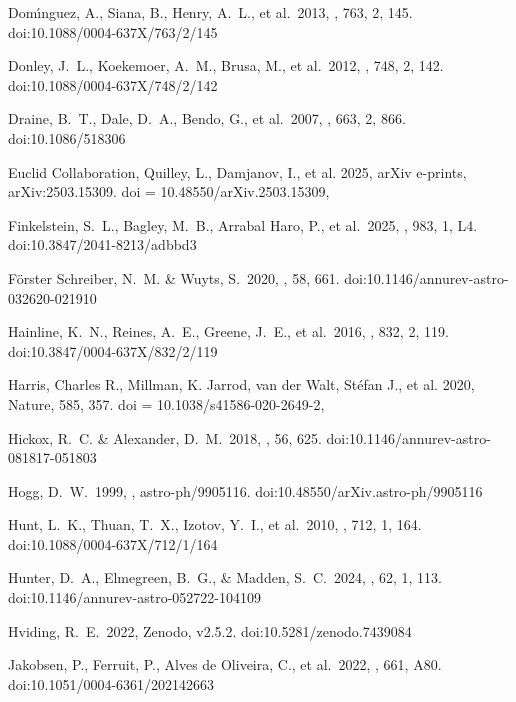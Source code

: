 \documentclass[twocolumn]{aastex63}
\begin{document}
{\begin{thebibliography}{}
 Dom{\'\i}nguez, A., Siana, B., Henry, A.~L., et al.\ 2013, \apj, 763, 2, 145. doi:10.1088/0004-637X/763/2/145

 Donley, J.~L., Koekemoer, A.~M., Brusa, M., et al.\ 2012, \apj, 748, 2, 142. doi:10.1088/0004-637X/748/2/142

 Draine, B.~T., Dale, D.~A., Bendo, G., et al.\ 2007, \apj, 663, 2, 866. doi:10.1086/518306

 {Euclid Collaboration}, {Quilley}, L., {Damjanov}, I., et al.  2025,  {arXiv e-prints}, {arXiv:2503.15309}.       doi = {10.48550/arXiv.2503.15309},

 Finkelstein, S.~L., Bagley, M.~B., Arrabal Haro, P., et al.\ 2025, \apjl, 983, 1, L4. doi:10.3847/2041-8213/adbbd3

 F{\"o}rster Schreiber, N.~M. \& Wuyts, S.\ 2020, \araa, 58, 661. doi:10.1146/annurev-astro-032620-021910

 Hainline, K.~N., Reines, A.~E., Greene, J.~E., et al.\ 2016, \apj, 832, 2, 119. doi:10.3847/0004-637X/832/2/119

 {Harris, Charles R.,  Millman, K. Jarrod,  van der Walt, St{\'{e}}fan J., et al. 2020, {Nature}, {585}, 357. doi           = {10.1038/s41586-020-2649-2},

 Hickox, R.~C. \& Alexander, D.~M.\ 2018, \araa, 56, 625. doi:10.1146/annurev-astro-081817-051803

 Hogg, D.~W.\ 1999, , astro-ph/9905116. doi:10.48550/arXiv.astro-ph/9905116

 Hunt, L.~K., Thuan, T.~X., Izotov, Y.~I., et al.\ 2010, \apj, 712, 1, 164. doi:10.1088/0004-637X/712/1/164

 Hunter, D.~A., Elmegreen, B.~G., \& Madden, S.~C.\ 2024, \araa, 62, 1, 113. doi:10.1146/annurev-astro-052722-104109

 Hviding, R.~E.\ 2022, Zenodo, v2.5.2. doi:10.5281/zenodo.7439084

 Jakobsen, P., Ferruit, P., Alves de Oliveira, C., et al.\ 2022, \aap, 661, A80. doi:10.1051/0004-6361/202142663

}
\end{thebibliography}}
\end{document}
